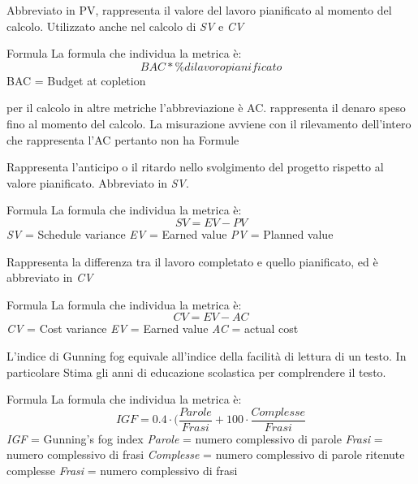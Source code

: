 Abbreviato in PV, rappresenta il valore del lavoro pianificato al momento del calcolo. Utilizzato anche nel calcolo di \textit{SV} e \textit{CV}
\par{Formula}
La formula che individua la metrica è:
\begin{displaymath}
  BAC * \% di lavoro pianif icato
\end{displaymath}
BAC = Budget at copletion


per il calcolo in altre metriche l'abbreviazione è AC.
rappresenta il denaro speso fino al momento del calcolo.
La misurazione avviene con il rilevamento dell'intero che rappresenta l'AC pertanto non ha Formule


Rappresenta l'anticipo o il ritardo nello svolgimento del progetto rispetto al valore pianificato. Abbreviato in \textit{SV}.
\par{Formula}
La formula che individua la metrica è:
\begin{displaymath}
  \textit{SV} = \textit{EV} - \textit{PV}
\end{displaymath}
\textit{SV} = Schedule variance
\textit{EV} = Earned value
\textit{PV} = Planned value


Rappresenta la differenza tra il lavoro completato e quello pianificato, ed è abbreviato in \textit{CV}
\par{Formula}
La formula che individua la metrica è:
\begin{displaymath}
  \textit{CV} = \textit{EV} - \textit{AC}
\end{displaymath}
\textit{CV} = Cost variance
\textit{EV} = Earned value
\textit{AC} = actual cost


L'indice di Gunning fog equivale all'indice della facilità di lettura di un testo. In particolare Stima gli anni di educazione scolastica per complrendere il testo.
\par{Formula}
La formula che individua la metrica è:
\begin{displaymath}
  \textit{IGF} = 0.4·(\frac{ \textit{Parole}}{\textit{Frasi}} + 100· \frac{\textit{Complesse}}{ \textit{Frasi}}
\end{displaymath}
\textit{IGF} = Gunning's fog index
\textit{Parole} = numero complessivo di parole
\textit{Frasi} = numero complessivo di frasi
\textit{Complesse} = numero complessivo di parole ritenute complesse
\textit{Frasi} = numero complessivo di frasi


